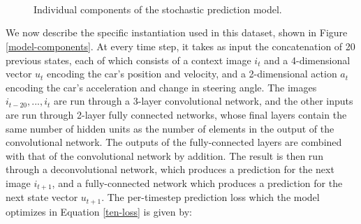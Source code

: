 \documentclass{article} %
\begin{document}
\begin{figure}[t!]
    \centering
     \\
     \\
     \\
    \caption{Individual components of the stochastic prediction model.}
\end{figure}
\label{model-components}


We now describe the specific instantiation used in this dataset, shown in Figure \ref{model-components}. At every time step, it takes as input the concatenation of 20 previous states, each of which consists of a context image $i_t$ and a 4-dimensional vector $u_t$ encoding the car's position and velocity, and a 2-dimensional action $a_t$ encoding the car's acceleration and change in steering angle.
The images $i_{t-20}, ..., i_t$ are run through a 3-layer convolutional network, and the other inputs are run through 2-layer fully connected networks, whose final layers contain the same number of hidden units as the number of elements in the output of the convolutional network. The outputs of the fully-connected layers are combined with that of the convolutional network by addition.
The result is then run through a deconvolutional network, which produces a prediction for the next image $i_{t+1}$, and a fully-connected network which produces a prediction for the next state vector $u_{t+1}$.
The per-timestep prediction loss which the model optimizes in Equation \ref{ten-loss} is given by:
\end{document}
